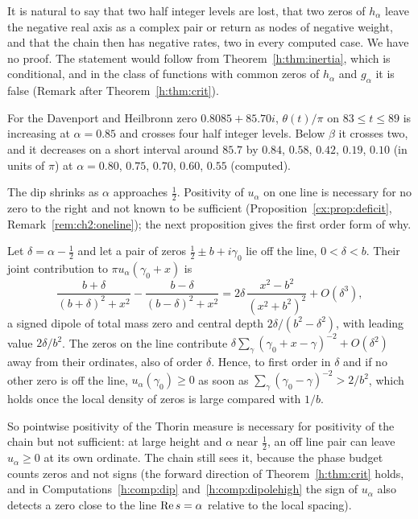 \begin{remark}[Heuristic]\label{h:rem:budget}
It is natural to say that two half integer levels are lost, that two zeros of $h_\alpha$ leave the negative real axis as a complex pair or return as nodes of negative weight, and that the chain then has negative rates, two in every computed case. We have no proof. The statement would follow from Theorem~\ref{h:thm:inertia}, which is conditional, and in the class of functions with common zeros of $h_\alpha$ and $g_\alpha$ it is false (Remark after Theorem~\ref{h:thm:crit}).\end{remark}

\begin{computation}\label{h:comp:dip}
For the Davenport and Heilbronn zero $0.8085+85.70i$, $\theta(t)/\pi$ on $83\le t\le89$ is increasing at $\alpha=0.85$ and crosses four half integer levels. Below $\beta$ it crosses two, and it decreases on a short interval around $85.7$ by $0.84$, $0.58$, $0.42$, $0.19$, $0.10$ (in units of $\pi$) at $\alpha=0.80$, $0.75$, $0.70$, $0.60$, $0.55$ (computed).
\end{computation}

The dip shrinks as $\alpha$ approaches $\frac12$. Positivity of $u_\alpha$ on one line is necessary for no zero to the right and not known to be sufficient (Proposition~\ref{cx:prop:deficit}, Remark~\ref{rem:ch2:oneline}); the next proposition gives the first order form of why.

\begin{proposition}[Dipole]\label{h:prop:dipole}
Let $\delta=\alpha-\frac12$ and let a pair of zeros $\frac12\pm b+i\gamma_0$ lie off the line, $0<\delta<b$. Their joint contribution to $\pi u_\alpha(\gamma_0+x)$ is
\[
\frac{b+\delta}{(b+\delta)^2+x^2}-\frac{b-\delta}{(b-\delta)^2+x^2}=2\delta\,\frac{x^2-b^2}{(x^2+b^2)^2}+O(\delta^3),
\]
a signed dipole of total mass zero and central depth $2\delta/(b^2-\delta^2)$, with leading value $2\delta/b^2$. The zeros on the line contribute $\delta\sum_\gamma(\gamma_0+x-\gamma)^{-2}+O(\delta^2)$ away from their ordinates, also of order $\delta$. Hence, to first order in $\delta$ and if no other zero is off the line, $u_\alpha(\gamma_0)\ge0$ as soon as $\sum_\gamma(\gamma_0-\gamma)^{-2}>2/b^2$, which holds once the local density of zeros is large compared with $1/b$.
\end{proposition}

So pointwise positivity of the Thorin measure is necessary for positivity of the chain but not sufficient: at large height and $\alpha$ near $\frac12$, an off line pair can leave $u_\alpha\ge0$ at its own ordinate. The chain still sees it, because the phase budget counts zeros and not signs (the forward direction of Theorem~\ref{h:thm:crit} holds, and in Computations~\ref{h:comp:dip} and~\ref{h:comp:dipolehigh} the sign of $u_\alpha$ also detects a zero close to the line $\operatorname{Re} s=\alpha$ relative to the local spacing).

